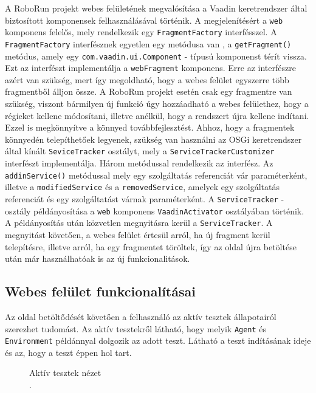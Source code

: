 A RoboRun projekt webes felületének megvalósítása a Vaadin keretrendszer által biztosított komponensek felhasználásával történik. A megjelenítésért a \texttt{web} komponens felelős, mely rendelkezik egy \texttt{FragmentFactory} interfésszel. A \texttt{FragmentFactory} interfésznek egyetlen egy metódusa van , a \texttt{getFragment()} metódus, amely egy \texttt{com.vaadin.ui.Component} - típusú komponenst térít vissza. Ezt az interfészt implementálja a \texttt{webFragment} komponens. Erre az interfészre azért van szükség, mert így megoldható, hogy a webes felület egyszerre több fragmentből álljon össze. A RoboRun projekt esetén csak egy fragmentre van szükség, viszont bármilyen új funkció úgy hozzáadható a webes felülethez, hogy a régieket kellene módosítani, illetve anélkül, hogy a rendszert újra kellene indítani. Ezzel is megkönnyítve a könnyed továbbfejlesztést. Ahhoz, hogy a fragmentek könnyedén telepíthetőek legyenek, szükség van használni az OSGi keretrendszer által kínált \texttt{SeviceTracker} osztályt, mely a \texttt{ServiceTrackerCustomizer} interfészt implementálja. Három metódussal rendelkezik az interfész. Az \texttt{addinService()} metódussal mely egy szolgáltatás referenciát vár paraméterként, illetve a \texttt{modifiedService} és a \texttt{removedService}, amelyek egy szolgáltatás referenciát és egy szolgáltatást várnak paraméterként. A \texttt{ServiceTracker} - osztály példányosítása a \texttt{web} komponens \texttt{VaadinActivator} osztályában történik. A példányosítás után közvetlen megnyitásra kerül a \texttt{ServiceTracker}. A megnyitást követően, a webes felület értesül arról, ha új fragment kerül telepítésre, illetve arról, ha egy fragmentet töröltek, így az oldal újra betöltése után már használhatóak is az új funkcionalitások.

\subsection{Webes felület funkcionalításai}\label{subsec:WebesFeluletFunkcioi}
Az oldal betöltődését követően a felhasználó az aktív tesztek állapotairól szerezhet tudomást. Az aktív tesztekről látható, hogy melyik \texttt{Agent} és \texttt{Environment} példánnyal dolgozik az adott teszt. Látható a teszt indításának ideje és az, hogy a teszt éppen hol tart.
\begin{figure}[h!]
  \centering
  \caption[Aktív tesztek nézet]%
  {Aktív tesztek nézet\\
  {\white .}\hfill\url{}}
  \label{fig:webAktivTesztek}
\end{figure}

